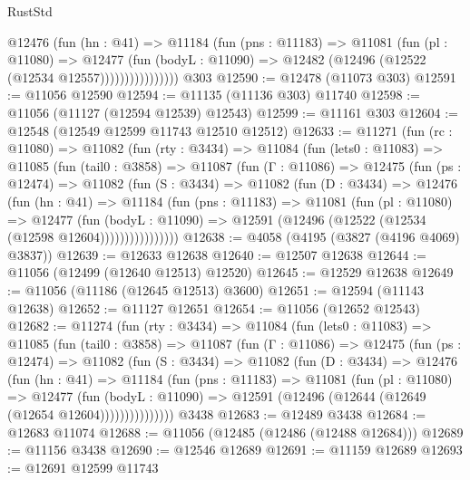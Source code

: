 \begin{lexlean}{RustStd}
\begin{coremodule}
                    @12476
                      (fun (hn : @41) =>
                      @11184
                        (fun (pns : @11183) =>
                        @11081
                          (fun (pl : @11080) =>
                          @12477
                            (fun (bodyL : @11090) =>
                            @12482 (@12496 (@12522 (@12534 @12557))))))))))))))))
    @303
@12590 := @12478 (@11073 @303)
@12591 := @11056 @12590
@12594 := @11135 (@11136 @303) @11740
@12598 := @11056 (@11127 (@12594 @12539) @12543)
@12599 := @11161 @303
@12604 := @12548 (@12549 @12599 @11743 @12510 @12512)
@12633 := @11271
    (fun (rc : @11080) =>
    @11082
      (fun (rty : @3434) =>
      @11084
        (fun (lets0 : @11083) =>
        @11085
          (fun (tail0 : @3858) =>
          @11087
            (fun (Γ : @11086) =>
            @12475
              (fun (ps : @12474) =>
              @11082
                (fun (S : @3434) =>
                @11082
                  (fun (D : @3434) =>
                  @12476
                    (fun (hn : @41) =>
                    @11184
                      (fun (pns : @11183) =>
                      @11081
                        (fun (pl : @11080) =>
                        @12477
                          (fun (bodyL : @11090) =>
                          @12591 (@12496 (@12522 (@12534 (@12598 @12604))))))))))))))))
@12638 := @4058 (@4195 (@3827 (@4196 @4069) @3837))
@12639 := @12633 @12638
@12640 := @12507 @12638
@12644 := @11056 (@12499 (@12640 @12513) @12520)
@12645 := @12529 @12638
@12649 := @11056 (@11186 (@12645 @12513) @3600)
@12651 := @12594 (@11143 @12638)
@12652 := @11127 @12651
@12654 := @11056 (@12652 @12543)
@12682 := @11274
    (fun (rty : @3434) =>
    @11084
      (fun (lets0 : @11083) =>
      @11085
        (fun (tail0 : @3858) =>
        @11087
          (fun (Γ : @11086) =>
          @12475
            (fun (ps : @12474) =>
            @11082
              (fun (S : @3434) =>
              @11082
                (fun (D : @3434) =>
                @12476
                  (fun (hn : @41) =>
                  @11184
                    (fun (pns : @11183) =>
                    @11081
                      (fun (pl : @11080) =>
                      @12477
                        (fun (bodyL : @11090) =>
                        @12591 (@12496 (@12644 (@12649 (@12654 @12604)))))))))))))))
    @3438
@12683 := @12489 @3438
@12684 := @12683 @11074
@12688 := @11056 (@12485 (@12486 (@12488 @12684)))
@12689 := @11156 @3438
@12690 := @12546 @12689
@12691 := @11159 @12689
@12693 := @12691 @12599 @11743

\end{coremodule}
\end{lexlean}

